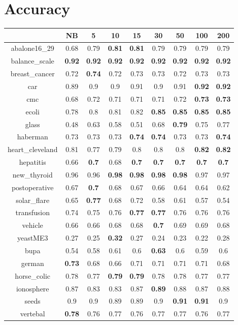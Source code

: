 \documentclass{article}%
\begin{document}
%
\normalsize%
\section*{Accuracy}%
\begin{tabular}{c|cccccccc}%
\hline%
&NB&5&10&15&30&50&100&200\\%
\hline%
abalone16\_29&0.68&0.79&\textbf{0.81}&\textbf{0.81}&0.79&0.79&0.79&0.79\\%
\hline%
balance\_scale&\textbf{0.92}&\textbf{0.92}&\textbf{0.92}&\textbf{0.92}&\textbf{0.92}&\textbf{0.92}&\textbf{0.92}&\textbf{0.92}\\%
\hline%
breast\_cancer&0.72&\textbf{0.74}&0.72&0.73&0.73&0.72&0.73&0.73\\%
\hline%
car&0.89&0.9&0.9&0.91&0.9&0.91&\textbf{0.92}&\textbf{0.92}\\%
\hline%
cmc&0.68&0.72&0.71&0.71&0.71&0.72&\textbf{0.73}&\textbf{0.73}\\%
\hline%
ecoli&0.78&0.8&0.81&0.82&\textbf{0.85}&\textbf{0.85}&\textbf{0.85}&\textbf{0.85}\\%
\hline%
glass&0.48&0.63&0.58&0.51&0.68&\textbf{0.79}&0.75&0.77\\%
\hline%
haberman&0.73&0.73&0.73&\textbf{0.74}&\textbf{0.74}&0.73&0.73&\textbf{0.74}\\%
\hline%
heart\_cleveland&0.81&0.77&0.79&0.8&0.8&0.8&\textbf{0.82}&\textbf{0.82}\\%
\hline%
hepatitis&0.66&\textbf{0.7}&0.68&\textbf{0.7}&\textbf{0.7}&\textbf{0.7}&\textbf{0.7}&\textbf{0.7}\\%
\hline%
new\_thyroid&0.96&0.96&\textbf{0.98}&\textbf{0.98}&\textbf{0.98}&\textbf{0.98}&0.97&0.97\\%
\hline%
postoperative&0.67&\textbf{0.7}&0.68&0.67&0.66&0.64&0.64&0.62\\%
\hline%
solar\_flare&0.65&\textbf{0.77}&0.68&0.72&0.58&0.61&0.57&0.54\\%
\hline%
transfusion&0.74&0.75&0.76&\textbf{0.77}&\textbf{0.77}&0.76&0.76&0.76\\%
\hline%
vehicle&0.66&0.66&0.68&0.68&\textbf{0.7}&0.69&0.69&0.68\\%
\hline%
yeastME3&0.27&0.25&\textbf{0.32}&0.27&0.24&0.23&0.22&0.28\\%
\hline%
bupa&0.54&0.58&0.61&0.6&\textbf{0.63}&0.6&0.59&0.6\\%
\hline%
german&\textbf{0.73}&0.68&0.66&0.71&0.71&0.71&0.71&0.68\\%
\hline%
horse\_colic&0.78&0.77&\textbf{0.79}&\textbf{0.79}&0.78&0.78&0.77&0.77\\%
\hline%
ionosphere&0.87&0.83&0.83&0.87&\textbf{0.89}&0.88&0.87&0.88\\%
\hline%
seeds&0.9&0.9&0.89&0.89&0.9&\textbf{0.91}&\textbf{0.91}&0.9\\%
\hline%
vertebal&\textbf{0.78}&0.76&0.77&0.76&0.77&0.77&0.76&0.77\\%
\hline%
\end{tabular}
\end{document}
